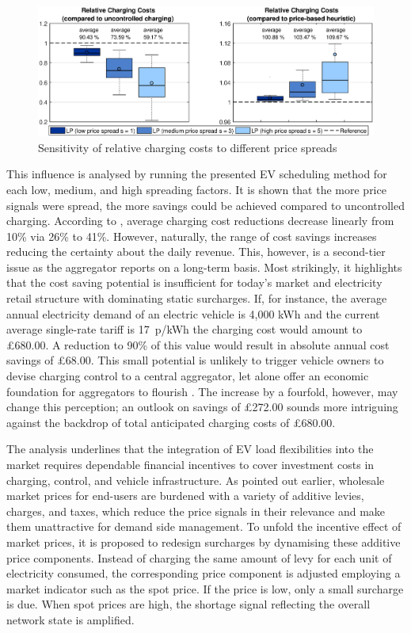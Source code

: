 \begin{figure}[]
	\includegraphics[width=\textwidth,trim={3cm 0cm 2.5cm 0cm},clip]{figures/evaluation/spreads.eps}
	\caption{Sensitivity of relative charging costs to different price spreads}
	\label{fig:spreads}
\end{figure}

This influence is analysed by running the presented EV scheduling method for each low, medium, and high spreading factors. It is shown that the more price signals were spread, the more savings could be achieved compared to uncontrolled charging. According to , average charging cost reductions decrease linearly from 10\% via 26\% to 41\%. However, naturally, the range of cost savings increases reducing the certainty about the daily revenue. This, however, is a second-tier issue as the aggregator reports on a long-term basis. Most strikingly, it highlights that the cost saving potential is insufficient for today's market and electricity retail structure with dominating static surcharges. If, for instance, the average annual electricity demand of an electric vehicle is 4,000 kWh and the current average single-rate tariff is \mbox{17 p/kWh} the charging cost would amount to \pounds 680.00. A reduction to 90\% of this value would result in absolute annual cost savings of \pounds 68.00. This small potential is unlikely to trigger vehicle owners to devise charging control to a central aggregator, let alone offer an economic foundation for aggregators to flourish \cite{Bessa2010}. The increase by a fourfold, however, may change this perception; an outlook on savings of \pounds 272.00 sounds more intriguing against the backdrop of total anticipated charging costs of \pounds 680.00.

The analysis underlines that the integration of EV load flexibilities into the market requires dependable financial incentives to cover investment costs in charging, control, and vehicle infrastructure. As pointed out earlier, wholesale market prices for end-users are burdened with a variety of additive levies, charges, and taxes, which reduce the price signals in their relevance and make them unattractive for demand side management. To unfold the incentive effect of market prices, it is proposed to redesign surcharges by dynamising these additive price components. Instead of charging the same amount of levy for each unit of electricity consumed, the corresponding price component is adjusted employing a market indicator such as the spot price. If the price is low, only a small surcharge is due. When spot prices are high, the shortage signal reflecting the overall network state is amplified.


